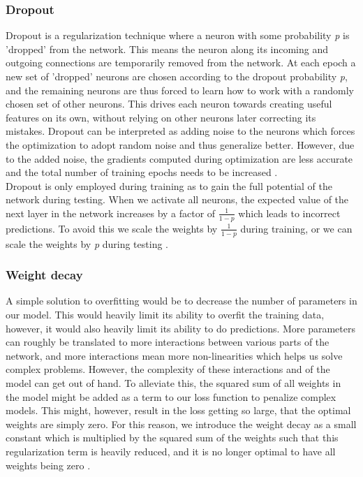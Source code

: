 \subsubsection{Dropout}
Dropout is a regularization technique where a neuron with some probability \textit{p} is 'dropped' from the network. This means the neuron along its incoming and outgoing connections are temporarily removed from the network. At each epoch a new set of 'dropped' neurons are chosen according to the dropout probability \textit{p}, and the remaining neurons are thus forced to learn how to work with a randomly chosen set of other neurons. This drives each neuron towards creating useful features on its own, without relying on other neurons later correcting its mistakes. Dropout can be interpreted as adding noise to the neurons which forces the optimization to adopt random noise and thus generalize better. However, due to the added noise, the gradients computed during optimization are less accurate and the total number of training epochs needs to be increased \cite{dropout}.\\
Dropout is only employed during training as to gain the full potential of the network during testing. When we activate all neurons, the expected value of the next layer in the network increases by a factor of $\frac{1}{1-p}$ which leads to incorrect predictions. To avoid this we scale the weights by $\frac{1}{1-p}$  during training, or we can scale the weights by \textit{p} during testing \cite{dropout}. 

\subsubsection{Weight decay}
A simple solution to overfitting would be to decrease the number of parameters in our model. This would heavily limit its ability to overfit the training data, however, it would also heavily limit its ability to do predictions. More parameters can roughly be translated to more interactions between various parts of the network, and more interactions mean more non-linearities which helps us solve complex problems. However, the complexity of these interactions and of the model can get out of hand. To alleviate this, the squared sum of all weights in the model might be added as a term to our loss function to penalize complex models. This might, however, result in the loss getting so large, that the optimal weights are simply zero. For this reason, we introduce the weight decay as a small constant which is multiplied by the squared sum of the weights such that this regularization term is heavily reduced, and it is no longer optimal to have all weights being zero \cite{weightdecay}. 

